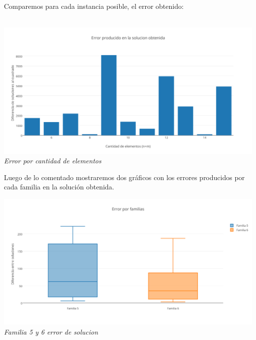Comparemos para cada instancia posible, el error obtenido: \\\\

\vspace*{0.3cm} \vspace*{0.3cm}
  \begin{center}
\includegraphics[scale=0.40]{./EJ2/randomdif.png}
\\{\textit{Error por cantidad de elementos }}
  \end{center}
  \vspace*{0.3cm}
  

Luego de lo comentado mostraremos dos gr\'aficos con los errores producidos por cada familia en la soluci\'on obtenida.

\vspace*{0.3cm} \vspace*{0.3cm}
  \begin{center}
\includegraphics[scale=0.60]{./EJ2/box1.png}
\\{\textit{Familia 5 y 6 error de solucion}}
  \end{center}
  \vspace*{0.3cm}
  
